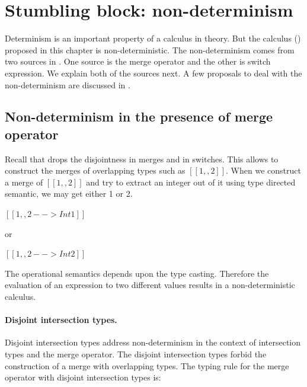 

\section{Stumbling block: non-determinism}
\label{sec:merge:non:determinism}

Determinism is an important property of a calculus in theory.
But the calculus (\namems) proposed in this chapter is non-deterministic.
The non-determinism comes from two sources in \namems.
One source is the merge operator and the other is switch expression.
We explain both of the sources next.
A few proposals to deal with the non-determinism are discussed in
.

\subsection{Non-determinism in the presence of merge operator}
Recall that \namems drops the disjointness in merges and
in switches. This allows to construct the merges of overlapping
types such as $[[1,,2]]$.
When we construct a merge of $[[1,,2]]$ and try to extract an integer
out of it using type directed semantic, we may get either 1 or 2.

\begin{center}
$[[1,,2 --> Int 1]]$ \ \ \ 
\end{center}

or

\begin{center}
$[[1,,2 --> Int 2]]$ \ \ \ 
\end{center}

\noindent The operational semantics depends upon the type casting.
Therefore the evaluation of an expression to two different
values results in a non-deterministic calculus.

\paragraph{Disjoint intersection types.} 
Disjoint intersection types \citep{oliveira2016disjoint} 
address non-determinism
in the context of intersection types and the merge operator.
The disjoint intersection types forbid the construction
of a merge with overlapping types.
The typing rule for the merge operator with disjoint intersection
types is:

